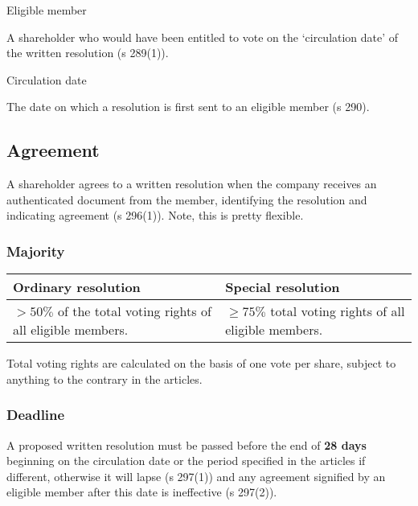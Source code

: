 \documentclass[
]{article}
\newenvironment{env-b20d3313-6f31-4d49-96f7-b40d8676adb1}
{
    \savenotes\tcolorbox[blanker,breakable,left=5pt,borderline west={2pt}{-4pt}{yellow}]
}
{
    \endtcolorbox\spewnotes
}
\begin{document}
\begin{env-b20d3313-6f31-4d49-96f7-b40d8676adb1}

Eligible member

A shareholder who would have been entitled to vote on the `circulation
date' of the written resolution (s 289(1)).

\end{env-b20d3313-6f31-4d49-96f7-b40d8676adb1}

\begin{env-b20d3313-6f31-4d49-96f7-b40d8676adb1}

Circulation date

The date on which a resolution is first sent to an eligible member (s
290).

\end{env-b20d3313-6f31-4d49-96f7-b40d8676adb1}

\hypertarget{agreement}{%
\subsection{Agreement}\label{agreement}}

A shareholder agrees to a written resolution when the company receives
an authenticated document from the member, identifying the resolution
and indicating agreement (s 296(1)). Note, this is pretty flexible.

\hypertarget{majority}{%
\subsubsection{Majority}\label{majority}}

\begin{longtable}[]{@{}ll@{}}
\toprule()
Ordinary resolution & Special resolution \\
\midrule()
\endhead
{\(> 50\%\)} of the total voting rights of all eligible members. &
{\(\geq 75\%\)} total voting rights of all eligible members. \\
\bottomrule()
\end{longtable}

Total voting rights are calculated on the basis of one vote per share,
subject to anything to the contrary in the articles.

\hypertarget{deadline}{%
\subsubsection{Deadline}\label{deadline}}

A proposed written resolution must be passed before the end of
\textbf{28 days} beginning on the circulation date or the period
specified in the articles if different, otherwise it will lapse (s
297(1)) and any agreement signified by an eligible member after this
date is ineffective (s 297(2)).
\end{document}
